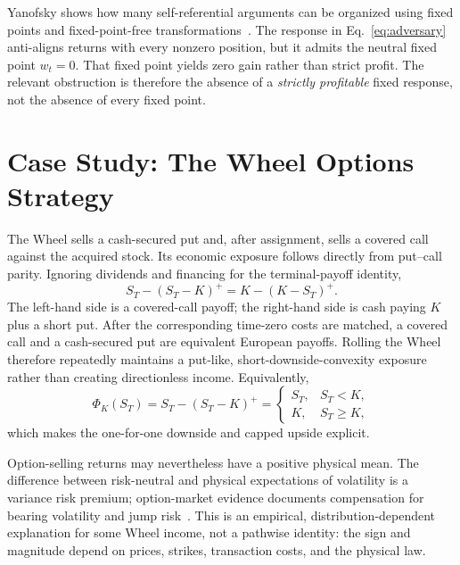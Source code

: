 \documentclass[aps,pra,reprint,superscriptaddress,amsmath,amssymb,floatfix]{revtex4-2}
\theoremstyle{plain}
\theoremstyle{definition}
\theoremstyle{remark}
\begin{document}
Yanofsky shows how many self-referential arguments can be organized using
fixed points and fixed-point-free transformations~\cite{Yanofsky-BSL:9051621}.
The response in Eq.~\eqref{eq:adversary} anti-aligns returns with every
nonzero position, but it admits the neutral fixed point \(w_t=0\). That fixed
point yields zero gain rather than strict profit. The relevant obstruction is
therefore the absence of a \emph{strictly profitable} fixed response, not the
absence of every fixed point.

\section{Case Study: The Wheel Options Strategy}
\label{sec:wheel}

The Wheel sells a cash-secured put and, after assignment, sells a covered call
against the acquired stock. Its economic exposure follows directly from
put--call parity. Ignoring dividends and financing for the terminal-payoff
identity,
\begin{equation}
  S_T-(S_T-K)^+
  =K-(K-S_T)^+.
  \label{eq:putcall}
\end{equation}
The left-hand side is a covered-call payoff; the right-hand side is cash
paying \(K\) plus a short put. After the corresponding time-zero costs are
matched, a covered call and a cash-secured put are equivalent European
payoffs. Rolling the Wheel therefore repeatedly maintains a put-like,
short-downside-convexity exposure rather than creating directionless income.
Equivalently,
\begin{equation}
  \Phi_K(S_T)
  =S_T-(S_T-K)^+
  =
  \begin{cases}
    S_T,&S_T<K,\\
    K,&S_T\geq K,
  \end{cases}
  \label{eq:wheelpiecewise}
\end{equation}
which makes the one-for-one downside and capped upside explicit.

Option-selling returns may nevertheless have a positive physical mean. The
difference between risk-neutral and physical expectations of volatility is a
variance risk premium; option-market evidence documents compensation for
bearing volatility and jump risk~\cite{BakshiKapadia2003,CarrWu2009}. This is
an empirical, distribution-dependent explanation for some Wheel income, not a
pathwise identity: the sign and magnitude depend on prices, strikes,
transaction costs, and the physical law.
\end{document}
